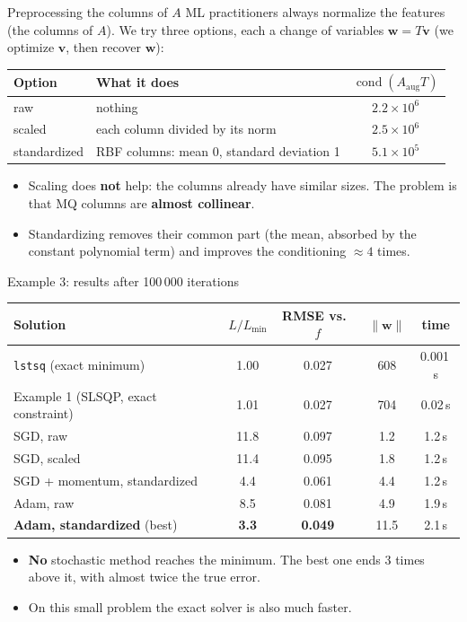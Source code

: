 \documentclass[10pt,aspectratio=169]{beamer}
\newcommand{\hl}[1]{\textcolor{accent}{\textbf{#1}}}
\begin{document}
\begin{frame}{Preprocessing the columns of $A$}
  ML practitioners always normalize the features (the columns of $A$).
  We try three options, each a change of variables $\bm{w} = T\bm{v}$
  (we optimize $\bm{v}$, then recover $\bm{w}$):
  \vspace{0.3em}
  \begin{center}
  \begin{tabular}{llc}
    \toprule
    Option & What it does & $\operatorname{cond}(A_{\text{aug}}T)$ \\
    \midrule
    raw & nothing & $2.2\times10^{6}$ \\
    scaled & each column divided by its norm & $2.5\times10^{6}$ \\
    standardized & RBF columns: mean 0, standard deviation 1 & $5.1\times10^{5}$ \\
    \bottomrule
  \end{tabular}
  \end{center}
  \begin{itemize}
    \item Scaling does \hl{not} help: the columns already have similar sizes.
          The problem is that MQ columns are \hl{almost collinear}.
    \item Standardizing removes their common part (the mean, absorbed by the
          constant polynomial term) and improves the conditioning
          $\approx 4$ times.
  \end{itemize}
\end{frame}

\begin{frame}{Example 3: results after 100\,000 iterations}
  \centering\small
  \begin{tabular}{lcccc}
    \toprule
    Solution & $L/L_{\min}$ & RMSE vs.\ $f$ & $\lVert\bm{w}\rVert$ & time \\
    \midrule
    \texttt{lstsq} (exact minimum) & 1.00 & 0.027 & 608 & 0.001\,s \\
    Example 1 (SLSQP, exact constraint) & 1.01 & 0.027 & 704 & 0.02\,s \\
    \midrule
    SGD, raw & 11.8 & 0.097 & 1.2 & 1.2\,s \\
    SGD, scaled & 11.4 & 0.095 & 1.8 & 1.2\,s \\
    SGD + momentum, standardized & 4.4 & 0.061 & 4.4 & 1.2\,s \\
    Adam, raw & 8.5 & 0.081 & 4.9 & 1.9\,s \\
    \hl{Adam, standardized} (best) & \hl{3.3} & \hl{0.049} & 11.5 & 2.1\,s \\
    \bottomrule
  \end{tabular}
  \vspace{0.8em}

  \raggedright
  \begin{itemize}
    \item \hl{No} stochastic method reaches the minimum. The best one ends
          3 times above it, with almost twice the true error.
    \item On this small problem the exact solver is also much faster.
  \end{itemize}
\end{frame}
\end{document}
